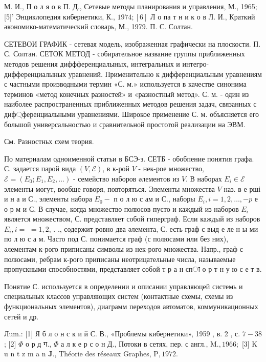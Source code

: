 \documentclass[10pt]{article}
\begin{document}
М. И., П о л я о в П. Д., Сетевые методы планирования и управления, М., 1965; [5]' Энциклопедия кибернетики, К., $1974 ;[6]$ Л о па т н и к о в Л. И., Краткий әкономико-математический словарь, М., 1979. П. С. Солтан.



СЕТЕВОИ ГРАФИК - сетевая модель, изображенная графически на плоскости. П. С. Солтан. СЕТОК МЕТОД - собирательное название группы приближенных методов решения диффференциалыных, интегральных и интегро-дифференциалыных уравнений. Применительно к дифференциальным уравнениям с частными производными термин «С. м.» используется в качестве синонима терминов «метод конечных разностей» и «разностный метод». С. м. - один из наиболее распространенных приближенных методов решения задач, связанных с диф্ференциальными уравнениями. Широкое применение С. м. объясняется его большой универсальностью и сравнительной простотой реализации на ЭВМ.



См. Разностньх схем теория.



По материалам одноименной статьи в БСЭ-з. СЕТБ - обобпение понятия графа. С. задается парой вида $(V, \mathscr{E})$, в к-рой $V$ - нек-рое множество, $\mathscr{E}=\left(E_{0} ; E_{1}, E_{2}, \ldots\right)$ - семейство наборов әлементов из $V$. В наборах $E_{i} \in \mathscr{E}$ элементы могут, вообще говоря, повторяться. Элементы множества $V$ наз. в е рші и н а и С., элементы набора $E_{0}-$ п о л ю с ам и С., наборы $E_{i}, i=1,2, \ldots,-p$ е $о$ р м и С. В случае, когда множество полюсов пусто и каждый из наборов $E_{i}$ является множеством, С. представляет собой гиперграф. Если каждый из наборов $E_{i}, i=$ $=1,2$, . ., содержит ровно два әлемента, С. есть граф с выд е ле н ы ми по л ю с а м. Часто под С. понимается граф (с полюсами или без них), әлементам к-рого приписаны символы из нек-рого множества. Напр., граф с полюсами, ребрам к-рого приписаны неотрицательные числа, называемые пропускными способностями, представляет собой т р а н спा о р т н у ю с е т в.



Понятие С. используется в определении и описании управляюцей системь и специальных классов управляющих систем (контактные схемы, схемы из функциональных элементов), диаграмм переходов автоматов, коммуникационных сетей и др.



Лum.: [1] Я б л о н с к и й С. В., «Проблемы кибернетики», 1959 , в. 2 , с. $7-38$; [2] $\Phi$ о р д ग., $\Phi$ а л к е р с о н Д., Потоки в сетях, пер. с англ., $\mathrm{M} ., 1966 ;$ [3] K u n t z m a n $\mathbf{J}$., Théorie des réseaux Graphes, $\mathrm{P}, 1972$.
\end{document}
